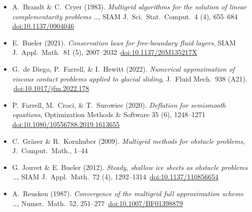 
\newcommand{\sdoi}[1]{\,{\tiny \href{https://doi.org/#1}{doi:#1}}}
\begin{itemize}
\item[] A.~Brandt \& C.~Cryer (1983). \emph{Multigrid algorithms for the solution of linear complementarity problems \dots}, SIAM J.~Sci.~Stat.~Comput.~4 (4), 655--684 \sdoi{10.1137/0904046}
\item[] E.~Bueler (2021). \emph{Conservation laws for free-boundary fluid layers}, SIAM J.~Appl.~Math.~81 (5), 2007--2032 \sdoi{10.1137/20M135217X}
\item[] G.~de Diego, P.~Farrell, \& I.~Hewitt (2022). \emph{Numerical approximation of viscous contact problems applied to glacial sliding}, J.~Fluid Mech.~938 (A21). \sdoi{10.1017/jfm.2022.178}
\item[] P.~Farrell, M.~Croci, \& T.~Surowiec (2020). \emph{Deflation for semismooth equations}, Optimization Methods \& Software 35 (6), 1248--1271 \sdoi{10.1080/10556788.2019.1613655}
\item[] C.~Gr{\"a}ser \& R.~Kornhuber (2009). \emph{Multigrid methods for obstacle problems}, J.~Comput.~Math., 1--44
\item[] G. Jouvet \& E. Bueler (2012). \emph{Steady, shallow ice sheets as obstacle problems \dots}, SIAM J.~Appl.~Math.~72 (4), 1292--1314 \sdoi{10.1137/110856654}
\item[] A.~Reusken (1987). \emph{Convergence of the multigrid full approximation scheme \dots}, Numer.~Math.~52, 251--277 \sdoi{10.1007/BF01398879}
\end{itemize}

